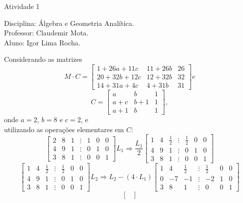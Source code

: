 \documentclass[12pt]{article}
\begin{document}
	\begin{center}
		Atividade 1
	\end{center}
	\begin{flushright}
		Disciplina: Álgebra e Geometria Analítica.\\
		Professor: Claudemir Mota.\\
		Aluno: Igor Lima Rocha.
	\end{flushright}
	

	\begin{center}
		Considerando as matrizes
		$$M \cdot C = \begin{bmatrix}
			1+26a+11c & 11+26b & 26 \\
			20+32b+12c & 12+32b & 32 \\
			14+31a+4c & 4+31b & 31
		\end{bmatrix} e$$
		$$C = \begin{bmatrix}
			a & b & 1\\
			a+c & b+1 & 1\\
			a+1 & b & 1
		\end{bmatrix},$$
		onde $a = 2$, $b = 8$ e $c = 2$, e \\
		utilizando as operações elementares em $C$:
		$$\begin{bmatrix}
			2 & 8 & 1 & \vdots & 1 & 0 & 0 \\
			4 & 9 & 1 & \vdots & 0 & 1 & 0 \\
			3 & 8 & 1 & \vdots & 0 & 0 & 1
		\end{bmatrix} L_1 \Rightarrow \frac{L_1}{2} \begin{bmatrix}
			1 & 4 & \frac{1}{2} & \vdots & \frac{1}{2} & 0 & 0 \\
			4 & 9 & 1 & \vdots & 0 & 1 & 0 \\
			3 & 8 & 1 & \vdots & 0 & 0 & 1
		\end{bmatrix}$$
		$$\begin{bmatrix}
			1 & 4 & \frac{1}{2} & \vdots & \frac{1}{2} & 0 & 0 \\
			4 & 9 & 1 & \vdots & 0 & 1 & 0 \\
			3 & 8 & 1 & \vdots & 0 & 0 & 1
		\end{bmatrix} L_2 \Rightarrow L_2-(4\cdot L_1) \begin{bmatrix}
			1 & 4 & \frac{1}{2} & \vdots & \frac{1}{2} & 0 & 0 \\
			0 & -7 & -1 & \vdots & -2 & 1 & 0 \\
			3 & 8 & 1 & \vdots & 0 & 0 & 1
		\end{bmatrix}$$
		$$\begin{bmatrix}

\end{bmatrix}$$
\end{center}
\end{document}
